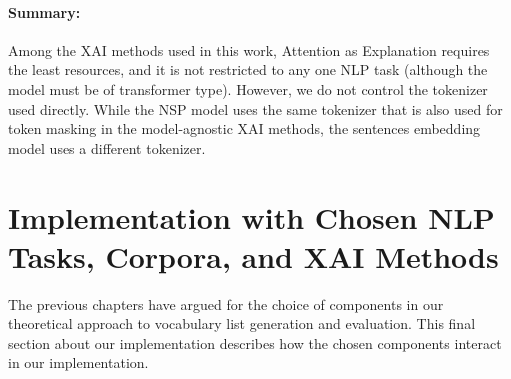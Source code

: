 \paragraph{Summary:}
Among the XAI methods used in this work, Attention as Explanation requires the least resources, and it is not restricted to any one NLP task (although the model must be of transformer type).
However, we do not control the tokenizer used directly.
While the NSP model uses the same tokenizer that is also used for token masking in the model-agnostic XAI methods, the sentences embedding model uses a different tokenizer.



%
%
\section{Implementation with Chosen NLP Tasks, Corpora, and XAI Methods} \label{sec:implementation-final}
The previous chapters have argued for the choice of components in our theoretical approach to vocabulary list generation and evaluation.
This final section about our implementation describes how the chosen components interact in our implementation.


% 	

